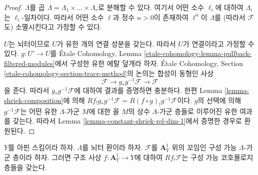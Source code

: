 \begin{proof}
$\Lambda$를 곱
$\Lambda = \Lambda_1 \times \ldots \times \Lambda_r$로 분해할 수
있다. 여기서 어떤 소수 $\ell_i$에 대하여 $\Lambda_i$는
$\ell_i$-일차이다. 따라서 어떤 소수 $\ell$과 정수 $n > 0$이 존재하여
$\ell^n$이 $\Lambda$를 (따라서 $\mathcal{F}$도) 소멸시킨다고
가정할 수 있다.

\medskip\noindent
$U$는 뇌터이므로 $U$가 유한 개의 연결 성분을 갖는다. 따라서 $U$가
연결이라고 가정할 수 있다.
$g : U' \to U$를 \'Etale Cohomology, Lemma
\ref{etale-cohomology-lemma-pullback-filtered-modules}에서 구성한 유한
에탈 덮개라 하자. \'Etale Cohomology, Section
\ref{etale-cohomology-section-trace-method}의 논의는 합성이 동형인 사상
$$
\mathcal{F} \to g_*g^{-1}\mathcal{F} \to \mathcal{F}
$$
을 준다. 따라서 $g_*g^{-1}\mathcal{F}$에 대하여 결과를 증명하면
충분하다. 한편 Lemma \ref{lemma-shriek-composition}에 의해
$Rf_!g_*g^{-1}\mathcal{F} = R(f \circ g)_!g^{-1}\mathcal{F}$이다.
$g$의 선택에 의해 $g^{-1}\mathcal{F}$는 어떤 유한
$\Lambda$-가군 $M$에 대한 꼴 $\underline{M}$의 상수
$\Lambda$-가군 층들로 이루어진 유한 여과를 갖는다.
따라서 Lemma \ref{lemma-constant-shriek-rel-dim-1}에서 증명한 경우로
환원된다.
\end{proof}

\begin{lemma}
\label{lemma-constructible-shriek-rel-dim-1}
$Y$를 아핀 스킴이라 하자. $\Lambda$를 뇌터 환이라 하자.
$\mathcal{F}$를 $\mathbf{A}^1_Y$ 위의 꼬임인 구성 가능
$\Lambda$-가군 층이라 하자. 그러면 구조 사상
$f : \mathbf{A}^1_Y \to Y$에 대하여 $Rf_!\mathcal{F}$는
구성 가능 코호몰로지 층들을 갖는다.
\end{lemma}

